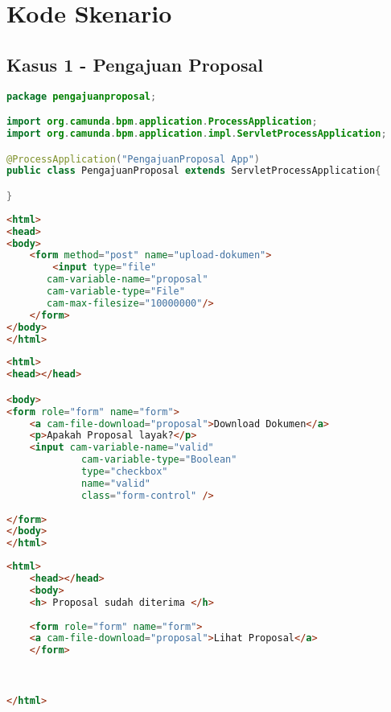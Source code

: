 \chapter{Kode Skenario}
\label{lamp:kodeskenario}

\section{Kasus 1 - Pengajuan Proposal}
\label{sec:kodekasus1}
\begin{lstlisting}[language=Java,basicstyle=\tiny,caption=PengajuanProposal.java]
package pengajuanproposal;

import org.camunda.bpm.application.ProcessApplication;
import org.camunda.bpm.application.impl.ServletProcessApplication;

@ProcessApplication("PengajuanProposal App")
public class PengajuanProposal extends ServletProcessApplication{

}
\end{lstlisting}

\begin{lstlisting}[language=html,basicstyle=\tiny,caption=MengunggahProposal.html]
<html>
<head>
<body>
	<form method="post" name="upload-dokumen">
		<input type="file"
       cam-variable-name="proposal"
       cam-variable-type="File"
       cam-max-filesize="10000000"/>
	</form>
</body>
</html>
\end{lstlisting}

\begin{lstlisting}[language=html,basicstyle=\tiny,caption=MemeriksaProposal.html]
<html>
<head></head>

<body>
<form role="form" name="form">
  	<a cam-file-download="proposal">Download Dokumen</a>
    <p>Apakah Proposal layak?</p>
    <input cam-variable-name="valid"
             cam-variable-type="Boolean"
             type="checkbox"
             name="valid"
             class="form-control" />
    
</form> 
</body>
</html>
\end{lstlisting}


\begin{lstlisting}[language=html,basicstyle=\tiny,caption=MelihatStatusProposal.html]
<html>
	<head></head>
	<body>
	<h> Proposal sudah diterima </h>
	
	<form role="form" name="form">
  	<a cam-file-download="proposal">Lihat Proposal</a>
  	</form>
	


</html>
\end{lstlisting}

